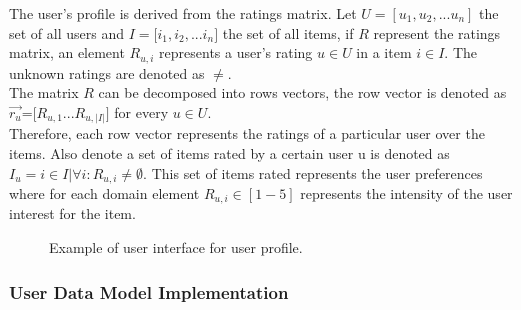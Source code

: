 The user's profile is derived from the ratings matrix. Let
$U=[u_1,u_2,...u_n]$ the set of all users and $ I=[i_1,i_2,$...$i_n] $
the set of all items, if $R$ represent the ratings matrix,  an element
$R_{u,i}$ represents a user’s rating $u \in U$  in a item $i \in I$.
The unknown ratings are denoted as $\neq $. \\ The matrix $R$ can be
decomposed into rows vectors, the row vector is denoted as $
\overrightarrow{r_u} $=$[R_{u,1}$...$R_{u,|I|}]$ for every $u \in U$.
\\ Therefore, each row vector represents the ratings of a particular user
over the items. Also denote a set of items rated by a certain user u
is denoted as $ I_u = i \in I | \forall  i: R_{u,i} \neq \emptyset $.
This set of items rated represents the user preferences where for each
domain element $R_{u,i} \in [1-5]$ represents the intensity of the
user interest for  the item.\\
\begin{figure}
\captionsetup{justification=centering,margin=2cm,font=footnotesize}
\centering
\setlength\fboxsep{0pt}
\caption{Example of user interface for user profile.}
\label{fig:user-profile}      
\end{figure}

\subsubsection{User Data Model Implementation} 

